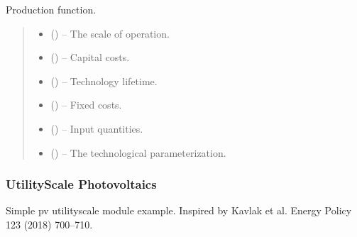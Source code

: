 \documentclass[letterpaper,10pt,english]{sphinxmanual}
\begin{document}
\begin{fulllineitems}
\label{\detokenize{technology:technology.pv_residential_simple.production}}
\pysigstartsignatures
{}
\pysigstopsignatures
\sphinxAtStartPar
Production function.
\begin{quote}\begin{description}
\begin{itemize}
\item {} 
\sphinxAtStartPar
{} () – The scale of operation.

\item {} 
\sphinxAtStartPar
{} () – Capital costs.

\item {} 
\sphinxAtStartPar
{} () – Technology lifetime.

\item {} 
\sphinxAtStartPar
{} () – Fixed costs.

\item {} 
\sphinxAtStartPar
{} () – Input quantities.

\item {} 
\sphinxAtStartPar
{} () – The technological parameterization.

\end{itemize}

\end{description}\end{quote}

\end{fulllineitems}



\subsubsection{Utility\sphinxhyphen{}Scale Photovoltaics}
\label{\detokenize{technology:module-technology.utility_pv}}\label{\detokenize{technology:utility-scale-photovoltaics}}
\sphinxAtStartPar
Simple pv utility\sphinxhyphen{}scale module example.  Inspired by Kavlak et al. Energy Policy 123 (2018) 700–710.
\end{document}
